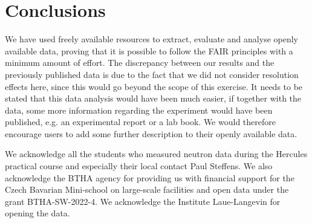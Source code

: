 \documentclass[aps,pra,reprint,amsmath,amssymb,superscriptaddress,showkeys]{revtex4-1}
\begin{document}
\section{Conclusions}

We have used freely available resources to extract, evaluate and analyse openly available data, proving that it is possible to follow the FAIR principles with a minimum amount of effort. 
The discrepancy between our results and the previously published data \cite{Aouissi} is due to the fact that we did not consider resolution effects here, since this would go beyond the scope of this exercise.
It needs to be stated that this data analysis would have been much easier, if together with the data, some more information regarding the experiment would have been published, e.g. an experimental report or a lab book.
We would therefore encourage users to add some further description to their openly available data. 


\begin{acknowledgments}
We acknowledge all the students who measured neutron data \cite{data} during the Hercules practical course and especially their local contact Paul Steffens. 
We also acknowledge the BTHA agency for providing us with financial support for the Czech Bavarian Mini-school on large-scale facilities and open data under the grant BTHA-SW-2022-4. We acknowledge the Institute Laue-Langevin for opening the data.
\end{acknowledgments}



\end{document}
